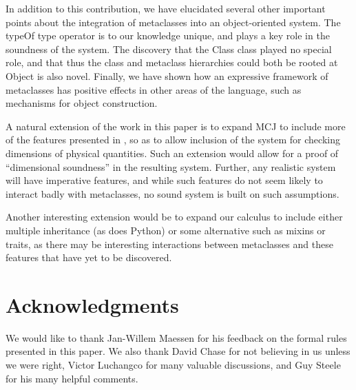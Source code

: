 \documentclass{acm-sigplan}
\begin{document}
In addition to this contribution, we have elucidated several other
important points about the integration of metaclasses into an
object-oriented system.  The {\txt typeOf} type operator is to our
knowledge unique, and plays a key role in the soundness of the
system.  The discovery that the {\txt Class} class played no special
role, and that thus the class and metaclass hierarchies could both be
rooted at {\txt Object} is also novel.  Finally, we have shown how an
expressive framework of metaclasses has positive effects in other
areas of the language, such as mechanisms for object construction.  

A natural extension of the work in this paper is to expand MCJ to
include more of the features presented in \cite{DimUnits}, so as to
allow inclusion of the system for checking dimensions of physical
quantities. Such an extension would allow for a proof of  ``dimensional
soundness'' in the resulting system.  Further, any realistic system
will have imperative features, and while such features do not seem
likely to interact badly with metaclasses, no sound system is built on
such assumptions.  

Another interesting extension would be to expand our calculus to
include either multiple inheritance (as does Python) or some
alternative such as mixins or traits, as there may be interesting
interactions between metaclasses and these features that have yet to
be discovered.

\section*{Acknowledgments}

We would like to thank Jan-Willem Maessen for his 
feedback on the formal rules presented in this paper.  We also thank
David Chase for not believing in us unless we were right, Victor
Luchangco for many valuable discussions, and Guy Steele for his many
helpful comments.




\end{document}
